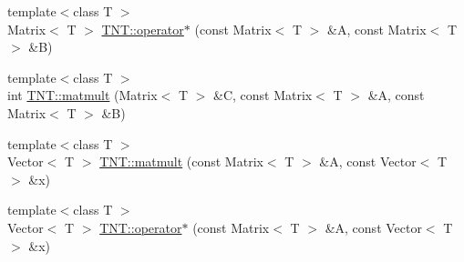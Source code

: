 \begin{DoxyCompactItemize}
{\footnotesize template$<$class T $>$ }\\Matrix$<$ T $>$ \hyperlink{namespace_t_n_t_ac7d0ba2e0a49b98ca66bb673b65bebcf}{TNT::operator$\ast$} (const Matrix$<$ T $>$ \&A, const Matrix$<$ T $>$ \&B)
\item 
{\footnotesize template$<$class T $>$ }\\int \hyperlink{namespace_t_n_t_ab150bc9116fc808e59075bc0748e0e3c}{TNT::matmult} (Matrix$<$ T $>$ \&C, const Matrix$<$ T $>$ \&A, const Matrix$<$ T $>$ \&B)
\item 
{\footnotesize template$<$class T $>$ }\\Vector$<$ T $>$ \hyperlink{namespace_t_n_t_ae8ef3b83f0c645ffb3c5db9d653e0625}{TNT::matmult} (const Matrix$<$ T $>$ \&A, const Vector$<$ T $>$ \&x)
\item 
{\footnotesize template$<$class T $>$ }\\Vector$<$ T $>$ \hyperlink{namespace_t_n_t_a34f973c4d8e918b55ff43d661151fa3d}{TNT::operator$\ast$} (const Matrix$<$ T $>$ \&A, const Vector$<$ T $>$ \&x)
\end{DoxyCompactItemize}
